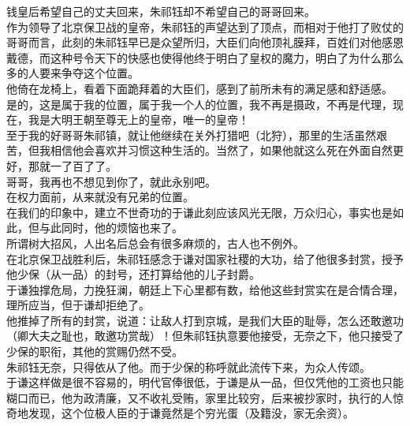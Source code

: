 \begin{multicols}{\theparacolNo}
钱皇后希望自己的丈夫回来，朱祁钰却不希望自己的哥哥回来。\\

作为领导了北京保卫战的皇帝，朱祁钰的声望达到了顶点，而相对于他打了败仗的哥哥而言，此刻的朱祁钰早已是众望所归，大臣们向他顶礼膜拜，百姓们对他感恩戴德，而这种号令天下的快感也使得他终于明白了皇权的魔力，明白了为什么那么多的人要来争夺这个位置。\\

他倚在龙椅上，看着下面跪拜着的大臣们，感到了前所未有的满足感和舒适感。\\

是的，这是属于我的位置，属于我一个人的位置，我不再是摄政，不再是代理，现在，我是大明王朝至尊无上的皇帝，唯一的皇帝！\\

至于我的好哥哥朱祁镇，就让他继续在关外打猎吧（北狩），那里的生活虽然艰苦，但我相信他会喜欢并习惯这种生活的。当然了，如果他就这么死在外面自然更好，那就一了百了了。\\

哥哥，我再也不想见到你了，就此永别吧。\\

在权力面前，从来就没有兄弟的位置。\\

在我们的印象中，建立不世奇功的于谦此刻应该风光无限，万众归心，事实也是如此，但与此同时，他的烦恼也来了。\\

所谓树大招风，人出名后总会有很多麻烦的，古人也不例外。\\

在北京保卫战胜利后，朱祁钰感念于谦对国家社稷的大功，给了他很多封赏，授予他少保（从一品）的封号，还打算给他的儿子封爵。\\

于谦独撑危局，力挽狂澜，朝廷上下心里都有数，给他这些封赏实在是合情合理，理所应当，但于谦却拒绝了。\\

他推掉了所有的封赏，说道：让敌人打到京城，是我们大臣的耻辱，怎么还敢邀功（卿大夫之耻也，敢邀功赏哉）！但朱祁钰执意要他接受，无奈之下，他只接受了少保的职衔，其他的赏赐仍然不受。\\

朱祁钰无奈，只得依从了他。而于少保的称呼就此流传下来，为众人传颂。\\

于谦这样做是很不容易的，明代官俸很低，于谦是从一品，但仅凭他的工资也只能糊口而已，他为政清廉，又不收礼受贿，家里比较穷，后来被抄家时，执行的人惊奇地发现，这个位极人臣的于谦竟然是个穷光蛋（及籍没，家无余资）。\\


\end{multicols}
